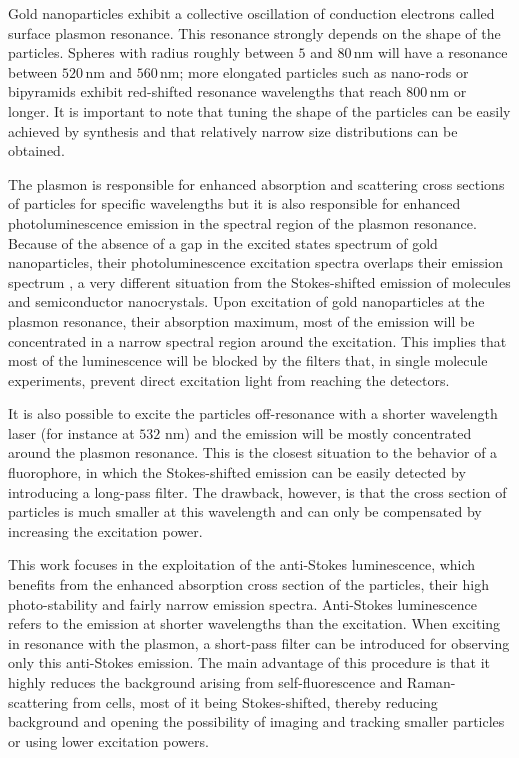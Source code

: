 \documentclass[journal=nalefd,manuscript=letter]{achemso}
\newcommand{\nm}{\ensuremath{\,\textrm{nm}}}
\begin{document}
Gold nanoparticles exhibit a collective oscillation of conduction electrons
called surface plasmon resonance\cite{Bouhelier2005}. This resonance strongly
depends on the shape of the particles\cite{Dulkeith2004}\cite{Link2000a}.
Spheres with radius roughly between $5$ and $80\nm$ will have a resonance
between $520\nm$ and $560\nm$; more elongated particles such as nano-rods or
bipyramids\cite{Rao2015} exhibit red-shifted resonance wavelengths that reach $800\nm$ or
longer\cite{Ngoc2015}. It is important to note that tuning the shape of the
particles can be easily achieved by synthesis and that relatively narrow
size distributions can be obtained\cite{Nikoobakht2003}.

The plasmon is responsible for enhanced absorption and scattering cross
sections\cite{Ni2008} of particles for specific wavelengths but it is also
responsible for enhanced photoluminescence emission in the spectral region of the
plasmon resonance. Because of the absence of a gap in the excited
states spectrum of gold nanoparticles, their photoluminescence excitation spectra overlaps
their emission spectrum\cite{Yorulmaz2012} , a very different situation from the Stokes-shifted
emission of molecules and semiconductor nanocrystals. Upon excitation of gold nanoparticles at
the plasmon resonance, their absorption maximum, most of the emission will be concentrated in
a narrow spectral region around the excitation. This implies that most of the luminescence will be
blocked by the filters that, in single molecule experiments, prevent direct excitation light from reaching the detectors.

It is also possible to excite the particles off-resonance with a shorter
wavelength laser (for instance at $532\,\nm$) and the emission will be mostly
concentrated around the plasmon resonance. This is the closest situation to the
behavior of a fluorophore, in which the Stokes-shifted emission can be easily
detected by introducing a long-pass filter. The drawback, however, is that the
cross section of particles is much smaller at this wavelength and can only be
compensated by increasing the excitation power.

This work focuses in the exploitation of the anti-Stokes luminescence\cite{Jiang2013},
which benefits from the enhanced absorption cross section of the particles, their high photo-stability
and fairly narrow emission spectra. Anti-Stokes luminescence refers to the emission at shorter
wavelengths than the excitation. When exciting in resonance with the plasmon, a short-pass
filter can be introduced for observing only this anti-Stokes emission. The main
advantage of this procedure is that it highly reduces the background arising
from self-fluorescence and Raman-scattering from cells, most of it being Stokes-shifted,
thereby reducing background and opening the possibility
of imaging and tracking smaller particles or using lower excitation powers.
\end{document}
